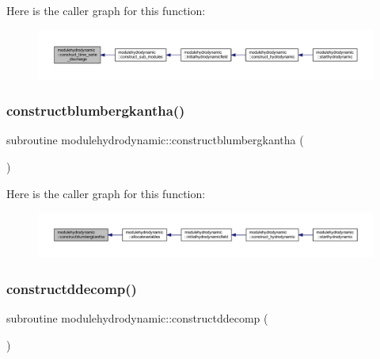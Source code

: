 Here is the caller graph for this function\+:\nopagebreak
\begin{figure}[H]
\begin{center}
\leavevmode
\includegraphics[width=350pt]{namespacemodulehydrodynamic_ae0edf0b5ed199a732c27734b798443ab_icgraph}
\end{center}
\end{figure}
\mbox{\label{namespacemodulehydrodynamic_afd2aaa7b8dac18e2bd28abcf31a9cb16}} 
\subsubsection{\texorpdfstring{constructblumbergkantha()}{constructblumbergkantha()}}
{\footnotesize\ttfamily subroutine modulehydrodynamic\+::constructblumbergkantha (\begin{DoxyParamCaption}{ }\end{DoxyParamCaption})\hspace{0.3cm}{\ttfamily [private]}}

Here is the caller graph for this function\+:\nopagebreak
\begin{figure}[H]
\begin{center}
\leavevmode
\includegraphics[width=350pt]{namespacemodulehydrodynamic_afd2aaa7b8dac18e2bd28abcf31a9cb16_icgraph}
\end{center}
\end{figure}
\mbox{\label{namespacemodulehydrodynamic_ac05ecc81fa8270b9ed0247f513b0c5d9}} 
\subsubsection{\texorpdfstring{constructddecomp()}{constructddecomp()}}
{\footnotesize\ttfamily subroutine modulehydrodynamic\+::constructddecomp (\begin{DoxyParamCaption}{ }\end{DoxyParamCaption})\hspace{0.3cm}{\ttfamily [private]}}

